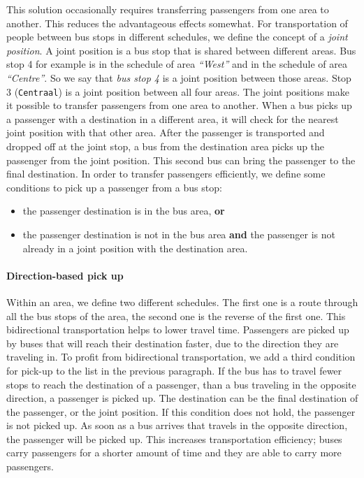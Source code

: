 This solution occasionally requires transferring passengers from one area to another. This reduces the advantageous effects somewhat. For transportation of people between bus stops in different schedules, we define the concept of a \textit{joint position}. A joint position is a bus stop that is shared between different areas. Bus stop 4 for example is in the schedule of area \textit{``West''} and in the schedule of area \textit{``Centre''}. So we say that \textit{bus stop 4} is a joint position between those areas. Stop 3 (\texttt{Centraal}) is a joint position between all four areas. The joint positions make it possible to transfer passengers from one area to another. When a bus picks up a passenger with a destination in a different area, it will check for the nearest joint position with that other area. After the passenger is transported and dropped off at the joint stop, a bus from the destination area picks up the passenger from the joint position. This second bus can bring the passenger to the final destination. In order to transfer passengers efficiently, we define some conditions to pick up a passenger from a bus stop:

\begin{itemize}
\item the passenger destination is in the bus area, \textbf{or}
\item the passenger destination is not in the bus area \textbf{and} the passenger is not already in a joint position with the destination area.
\end{itemize}

\paragraph{Direction-based pick up}

Within an area, we define two different schedules. The first one is a route through all the bus stops of the area, the second one is the reverse of the first one. This bidirectional transportation helps to lower travel time. Passengers are picked up by buses that will reach their destination faster, due to the direction they are traveling in. To profit from bidirectional transportation, we add a third condition for pick-up to the list in the previous paragraph. If the bus has to travel fewer stops to reach the destination of a passenger, than a bus traveling in the opposite direction, a passenger is picked up. The destination can be the final destination of the passenger, or the joint position. If this condition does not hold, the passenger is not picked up. As soon as a bus arrives that travels in the opposite direction, the passenger will be picked up. This increases transportation efficiency; buses carry passengers for a shorter amount of time and they are able to carry more passengers. 

